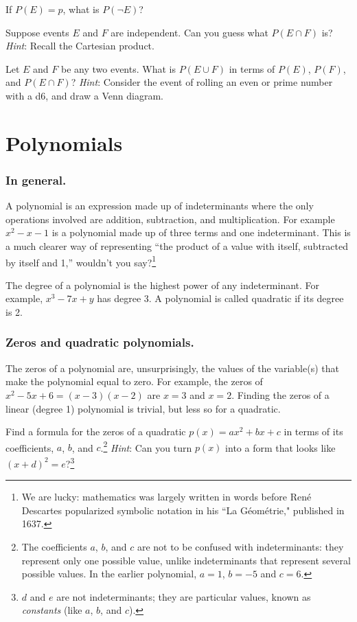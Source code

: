 \documentclass{book}
\begin{document}
\begin{exercise}\label{q:neg}
If $P(E) = p$, what is $P(\neg E)$?
\end{exercise}
\begin{exercise}\label{q:cap}
Suppose events $E$ and $F$ are independent. Can you guess what $\displaystyle P(E \cap F)$ is? \emph{Hint}: Recall the Cartesian product.
\end{exercise}
\begin{exercise}\label{q:cup}
Let $E$ and $F$ be any two events. What is $P(E \cup F)$ in terms of $P(E)$, $P(F)$, and $\displaystyle P(E \cap F)$? \emph{Hint}: Consider the event of rolling an even or prime number with a d6, and draw a Venn diagram.
\end{exercise}

\section{Polynomials}
\subsubsection*{In general.}
A polynomial is an expression made up of indeterminants where the only operations involved are addition, subtraction, and multiplication. For example $x^2 - x - 1$ is a polynomial made up of three terms and one indeterminant. This is a much clearer way of representing ``the product of a value with itself, subtracted by itself and 1,'' wouldn't you say?\footnote{We are lucky: mathematics was largely written in words before Ren\'e Descartes popularized symbolic notation in his ``La G\'eom\'etrie," published in 1637.}

The degree of a polynomial is the highest power of any indeterminant. For example, $x^3 - 7x + y$ has degree 3. A polynomial is called quadratic if its degree is 2.

\subsubsection*{Zeros and quadratic polynomials.}
The zeros of a polynomial are, unsurprisingly, the values of the variable(s) that make the polynomial equal to zero. For example, the zeros of $x^2 - 5x + 6 = (x-3)(x-2)$ are $x = 3$ and $x = 2$. Finding the zeros of a linear (degree 1) polynomial is trivial, but less so for a quadratic.

\begin{exercise}\label{completesquare}
Find a formula for the zeros of a quadratic $p(x) = ax^2 + bx + c$ in terms of its coefficients, $a$, $b$, and $c$.\footnote{The coefficients $a$, $b$, and $c$ are not to be confused with indeterminants: they represent only one possible value, unlike indeterminants that represent several possible values. In the earlier polynomial, $a = 1$, $b = -5$ and $c = 6$.} \emph{Hint}: Can you turn $p(x)$ into a form that looks like $(x + d)^2 = e$?\footnote{$d$ and $e$ are not indeterminants; they are particular values, known as \emph{constants}  (like $a$, $b$, and $c$).}
\end{exercise}
\end{document}
